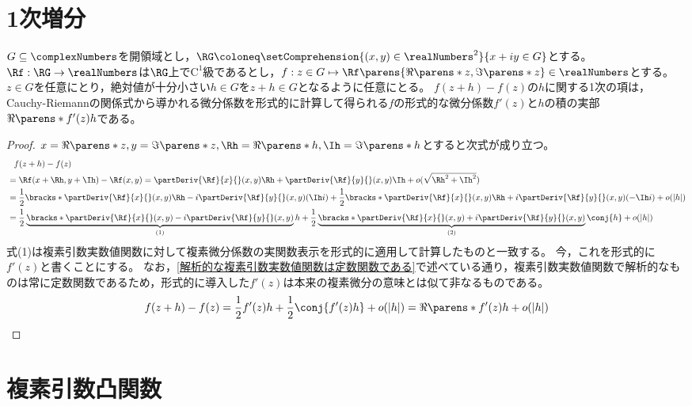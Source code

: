     \section{1次増分}
        \begin{shadebox}
            $G\subseteq\complexNumbers$を開領域とし，$\RG\coloneq\setComprehension{(x,y)\in\realNumbers^2}{x+iy\in G}$とする。
            $\Rf:\RG\to\realNumbers$は$\RG$上で$\mathrm{C}^1$級であるとし，$f:z\in G\mapsto\Rf\parens{\Re\parens*{z},\Im\parens*{z}}\in\realNumbers$とする。
            $z\in G$を任意にとり，絶対値が十分小さい$h\in G$を$z+h\in G$となるように任意にとる。
            $f(z+h)-f(z)$の$h$に関する1次の項は，Cauchy-Riemannの関係式から導かれる微分係数を形式的に計算して得られる$f$の形式的な微分係数$f'(z)$と$h$の積の実部$\Re\parens*{f'(z)h}$である。
        \end{shadebox}
        \begin{proof}
            $x=\Re\parens*{z},y=\Im\parens*{z},\Rh=\Re\parens*{h},\Ih=\Im\parens*{h}$とすると次式が成り立つ。
            \begin{align*}
                &\phantom{=} f(z+h) - f(z) \\
                &= \Rf(x+\Rh,y+\Ih) - \Rf(x,y) = \partDeriv{\Rf}{x}{}(x,y)\Rh + \partDeriv{\Rf}{y}{}(x,y)\Ih + o(\sqrt{\Rh^2+\Ih^2}) \\
                &= \frac{1}{2}\bracks*{\partDeriv{\Rf}{x}{}(x,y)\Rh - i\partDeriv{\Rf}{y}{}(x,y)(\Ih i)} + \frac{1}{2}\bracks*{\partDeriv{\Rf}{x}{}(x,y)\Rh + i\partDeriv{\Rf}{y}{}(x,y)(-\Ih i)} + o(|h|) \\
                &= \frac{1}{2}\underbrace{\bracks*{\partDeriv{\Rf}{x}{}(x,y) - i\partDeriv{\Rf}{y}{}(x,y)}}_{\mathrm{(1)}}h + \frac{1}{2}\underbrace{\bracks*{\partDeriv{\Rf}{x}{}(x,y) + i\partDeriv{\Rf}{y}{}(x,y)}}_{\mathrm{(2)}}\conj{h} + o(|h|)
            \end{align*}
            式(1)は複素引数実数値関数に対して複素微分係数の実関数表示を形式的に適用して計算したものと一致する。
            今，これを形式的に$f'(z)$と書くことにする。
            なお，\ref{解析的な複素引数実数値関数は定数関数である}で述べている通り，複素引数実数値関数で解析的なものは常に定数関数であるため，形式的に導入した$f'(z)$は本来の複素微分の意味とは似て非なるものである。
            \[ f(z+h) - f(z) = \frac{1}{2}f'(z)h + \frac{1}{2}\conj{f'(z)h} + o(|h|) = \Re\parens*{f'(z)h} + o(|h|)\]
        \end{proof}
    \let\Rh\undefined
    \let\Ih\undefined
    \let\Rf\undefined
    \section{複素引数凸関数}
